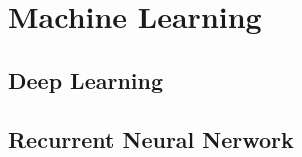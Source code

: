 \chapter{Machine Learning}\label{ch:machine_learning}

\section{Deep Learning}

\section{Recurrent Neural Nerwork}